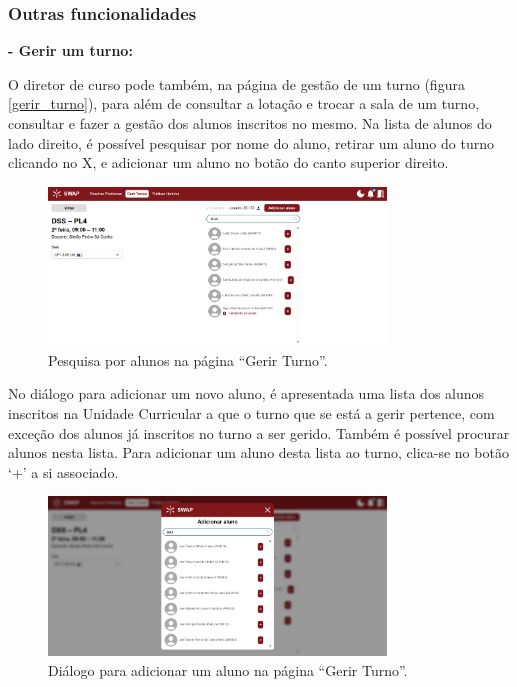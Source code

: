 \documentclass[12pt, a4paper]{article}
\begin{document}
\subsubsection{Outras funcionalidades}

\textbf{- Gerir um turno:}

O diretor de curso pode também, na página de gestão de um turno (figura \ref{gerir_turno}),
para além de consultar a lotação e trocar a sala de um turno, consultar e fazer a gestão dos
alunos inscritos no mesmo. Na lista de alunos do lado direito, é possível pesquisar por nome do
aluno, retirar um aluno do turno clicando no X, e adicionar um aluno no botão do canto superior
direito.

\begin{figure}[H]
    \centering
    \includegraphics[width=0.8\textwidth]{res/manual/gerir_turno_pesquisar_alunos.png}
    \caption{Pesquisa por alunos na página ``Gerir Turno''.}
    \label{gerir_turno_pesquisar}
\end{figure}

No diálogo para adicionar um novo aluno, é apresentada uma lista dos alunos inscritos na Unidade
Curricular a que o turno que se está a gerir pertence, com exceção dos alunos já inscritos no turno
a ser gerido. Também é possível procurar alunos nesta lista. Para adicionar um aluno desta lista ao
turno, clica-se no botão ‘+’ a si associado.

\begin{figure}[H]
    \centering
    \includegraphics[width=0.8\textwidth]{res/manual/adicionar_aluno.png}
    \caption{Diálogo para adicionar um aluno na página ``Gerir Turno''.}
    \label{adicionar_aluno}
\end{figure}
\end{document}

